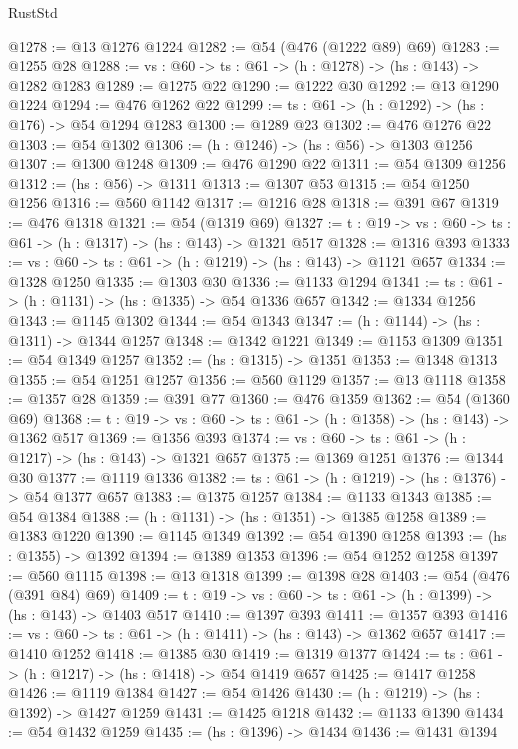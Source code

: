 \begin{lexlean}{RustStd}
\begin{coremodule}
@1278 := @13 @1276 @1224
@1282 := @54 (@476 (@1222 @89) @69)
@1283 := @1255 @28
@1288 := {vs : @60} -> {ts : @61} -> (h : @1278) -> (hs : @143) -> @1282 @1283
@1289 := @1275 @22
@1290 := @1222 @30
@1292 := @13 @1290 @1224
@1294 := @476 @1262 @22
@1299 := {ts : @61} -> (h : @1292) -> (hs : @176) -> @54 @1294 @1283
@1300 := @1289 @23
@1302 := @476 @1276 @22
@1303 := @54 @1302
@1306 := (h : @1246) -> (hs : @56) -> @1303 @1256
@1307 := @1300 @1248
@1309 := @476 @1290 @22
@1311 := @54 @1309 @1256
@1312 := (hs : @56) -> @1311
@1313 := @1307 @53
@1315 := @54 @1250 @1256
@1316 := @560 @1142
@1317 := @1216 @28
@1318 := @391 @67
@1319 := @476 @1318
@1321 := @54 (@1319 @69)
@1327 := {t : @19} -> {vs : @60} -> {ts : @61} -> (h : @1317) -> (hs : @143) -> @1321 @517
@1328 := @1316 @393
@1333 := {vs : @60} -> {ts : @61} -> (h : @1219) -> (hs : @143) -> @1121 @657
@1334 := @1328 @1250
@1335 := @1303 @30
@1336 := @1133 @1294
@1341 := {ts : @61} -> (h : @1131) -> (hs : @1335) -> @54 @1336 @657
@1342 := @1334 @1256
@1343 := @1145 @1302
@1344 := @54 @1343
@1347 := (h : @1144) -> (hs : @1311) -> @1344 @1257
@1348 := @1342 @1221
@1349 := @1153 @1309
@1351 := @54 @1349 @1257
@1352 := (hs : @1315) -> @1351
@1353 := @1348 @1313
@1355 := @54 @1251 @1257
@1356 := @560 @1129
@1357 := @13 @1118
@1358 := @1357 @28
@1359 := @391 @77
@1360 := @476 @1359
@1362 := @54 (@1360 @69)
@1368 := {t : @19} -> {vs : @60} -> {ts : @61} -> (h : @1358) -> (hs : @143) -> @1362 @517
@1369 := @1356 @393
@1374 := {vs : @60} -> {ts : @61} -> (h : @1217) -> (hs : @143) -> @1321 @657
@1375 := @1369 @1251
@1376 := @1344 @30
@1377 := @1119 @1336
@1382 := {ts : @61} -> (h : @1219) -> (hs : @1376) -> @54 @1377 @657
@1383 := @1375 @1257
@1384 := @1133 @1343
@1385 := @54 @1384
@1388 := (h : @1131) -> (hs : @1351) -> @1385 @1258
@1389 := @1383 @1220
@1390 := @1145 @1349
@1392 := @54 @1390 @1258
@1393 := (hs : @1355) -> @1392
@1394 := @1389 @1353
@1396 := @54 @1252 @1258
@1397 := @560 @1115
@1398 := @13 @1318
@1399 := @1398 @28
@1403 := @54 (@476 (@391 @84) @69)
@1409 := {t : @19} -> {vs : @60} -> {ts : @61} -> (h : @1399) -> (hs : @143) -> @1403 @517
@1410 := @1397 @393
@1411 := @1357 @393
@1416 := {vs : @60} -> {ts : @61} -> (h : @1411) -> (hs : @143) -> @1362 @657
@1417 := @1410 @1252
@1418 := @1385 @30
@1419 := @1319 @1377
@1424 := {ts : @61} -> (h : @1217) -> (hs : @1418) -> @54 @1419 @657
@1425 := @1417 @1258
@1426 := @1119 @1384
@1427 := @54 @1426
@1430 := (h : @1219) -> (hs : @1392) -> @1427 @1259
@1431 := @1425 @1218
@1432 := @1133 @1390
@1434 := @54 @1432 @1259
@1435 := (hs : @1396) -> @1434
@1436 := @1431 @1394

\end{coremodule}
\end{lexlean}
